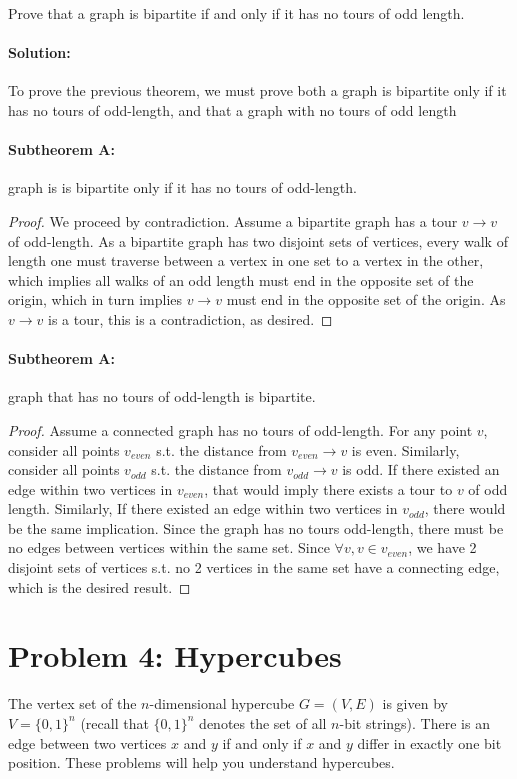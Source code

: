 \documentclass[11pt, notitlepage]{report}
\newcommand{\Question}[1]{\newpage\section{#1}}
\newenvironment{solution}{\paragraph{Solution:}}{\hfill}
\newenvironment{subtheorem}[1]{\paragraph{\small Subtheorem #1:}}{\hfill}
\begin{document}
Prove that a graph is bipartite if and only if it has no tours of odd length.
\vskip 0.5in
\begin{solution}
To prove the previous theorem, we must prove both a graph is bipartite only if it has no tours of odd-length, and that a graph with no tours of odd length  

\begin{subtheorem}{1}
	A graph is is bipartite only if it has no tours of odd-length.
	\begin{proof}
		We proceed by contradiction. Assume a bipartite graph has a tour $v \rightarrow v$ of odd-length. As a bipartite graph has two disjoint sets of vertices, every walk of length one must traverse between a vertex in one set to a vertex in the other, which implies all walks of an odd length must end in the opposite set of the origin, which in turn implies $v \rightarrow v$ must end in the opposite set of the origin. As $v \rightarrow v$ is a tour, this is a contradiction, as desired.	
	\end{proof}
\end{subtheorem}
\begin{subtheorem}{2}
	A graph that has no tours of odd-length is bipartite.
	\begin{proof}
		Assume a connected graph has no tours of odd-length. For any point $v$, consider all points $v_{even}$ s.t. the distance from $v_{even}\rightarrow v$ is even. Similarly, consider all points $v_{odd}$ s.t. the distance from $v_{odd}\rightarrow v$ is odd.   If there existed an edge within two vertices in $v_{even}$, that would imply there exists a tour to $v$ of odd length. Similarly, If there existed an edge within two vertices in $v_{odd}$, there would be the same implication. Since the graph has no tours odd-length, there must be no edges between vertices within the same set. Since $\forall v,v\in v_{even}$, we have 2 disjoint sets of vertices s.t. no 2 vertices in the same set have a connecting edge, which is the desired result.
	\end{proof}
\end{subtheorem}
\end{solution}
\Question{Problem 4: Hypercubes}
The vertex set of the $n$-dimensional hypercube $G=(V,E)$ is given by $V=\{0,1\}^n$ (recall that $\{0,1\}^n$ denotes the set of all $n$-bit strings). There is an edge between two vertices $x$ and $y$ if and only if $x$ and $y$ differ in exactly one bit position. These problems will help you understand hypercubes.
\end{document}
